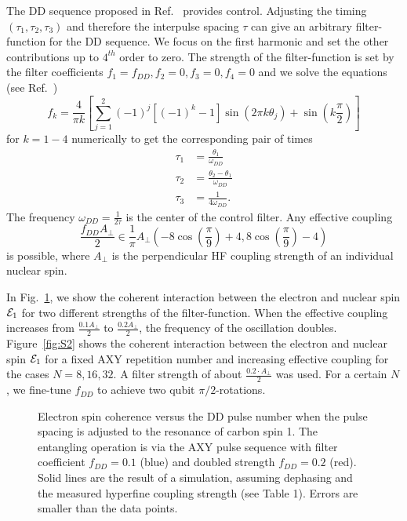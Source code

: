 \documentclass[aps,floatfix,footinbib,superscriptaddress]{revtex4-1}
\begin{document}
The DD sequence proposed in Ref.~\cite{Cas2015} provides control. Adjusting the timing $(\tau_1,\tau_2, \tau_3)$ and therefore the interpulse spacing $\tau$ can give an arbitrary filter-function for the DD sequence. We focus on the first harmonic and set the other contributions up to $4^{th}$ order to zero. The strength of the filter-function is set by the filter coefficients  $f_1=f_{DD},f_2=0,f_3=0,f_4=0$ and we solve the equations (see Ref.~\cite{Cas2015})
\begin{equation}
f_k = \frac{4}{\pi k} \left[\sum_{j=1}^{2} (-1)^j\left[(-1)^k-1\right]\sin\left(2\pi k \theta_j\right)+\sin\left(k\frac{\pi}{2}\right)\right]
\end{equation}
for $k=1-4$ numerically to get the corresponding pair of times 
\begin{align}
\tau_1 &= \frac{\theta_1}{\omega_{DD}}\\
\tau_2 &= \frac{\theta_2-\theta_1}{\omega_{DD}}\\  
\tau_3 &= \frac{1}{4\omega_{DD}}.
\end{align}
The frequency $\omega_{DD}=\frac{1}{2\tau}$ is the center of the control filter. Any effective coupling 
\begin{equation}
\frac{f_{DD}A_\perp}{2} \in \frac{1}{\pi}A_\perp\left(-8\cos(\frac{\pi}{9})+4,8\cos(\frac{\pi}{9})-4\right)
\end{equation}
is possible, where $A_\perp$ is the perpendicular HF coupling strength of an individual nuclear spin. 

In Fig.~\ref{fig:S1}, we show the coherent interaction between the electron and nuclear spin $\mathcal{E}_1$ for two different strengths of the filter-function. When the effective coupling increases from $\frac{0.1A_\perp}{2}$ to $\frac{0.2A_\perp}{2}$, the frequency of the oscillation doubles. Figure~\ref{fig:S2} shows the coherent interaction between the electron and nuclear spin $\mathcal{E}_1$ for a fixed AXY repetition number and increasing effective coupling for the cases $N=8,16,32$. A filter strength of about $\frac{0.2\cdot A_\perp}{2}$ was used. For a certain $N$, we fine-tune $f_{DD}$ to achieve two qubit $\pi/2$-rotations.

\begin{figure}[H]
\centerline{}
\caption{Electron spin coherence versus the DD pulse number when the pulse spacing is adjusted to the resonance of carbon spin 1. The entangling operation is via the AXY pulse sequence with filter coefficient $f_{DD}=0.1$ (blue) and doubled strength $f_{DD}=0.2$ (red). Solid lines are the result of a simulation, assuming dephasing and the measured hyperfine coupling strength (see Table 1). Errors are smaller than the data points.}
\label{fig:S1}
\end{figure}
\end{document}
